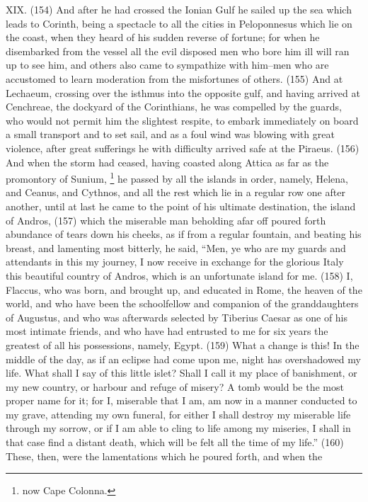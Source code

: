XIX. (154) And after he had crossed the Ionian Gulf he sailed up the sea which leads to Corinth,
being a spectacle to all the cities in Peloponnesus which lie on the coast, when they heard of his
sudden reverse of fortune; for when he disembarked from the vessel all the evil disposed men who
bore him ill will ran up to see him, and others also came to sympathize with him--men who are
accustomed to learn moderation from the misfortunes of others. (155) And at Lechaeum, crossing
over the isthmus into the opposite gulf, and having arrived at Cenchreae, the dockyard of the
Corinthians, he was compelled by the guards, who would not permit him the slightest respite, to
embark immediately on board a small transport and to set sail, and as a foul wind was blowing with
great violence, after great sufferings he with difficulty arrived safe at the Piraeus. (156) And when
the storm had ceased, having coasted along Attica as far as the promontory of Sunium, \footnote{now Cape
Colonna.} he passed by all the islands in order, namely, Helena, and Ceanus, and Cythnos, and all
the rest which lie in a regular row one after another, until at last he came to the point of his ultimate
destination, the island of Andros, (157) which the miserable man beholding afar off poured forth
abundance of tears down his cheeks, as if from a regular fountain, and beating his breast, and
lamenting most bitterly, he said, ``Men, ye who are my guards and attendants in this my journey, I
now receive in exchange for the glorious Italy this beautiful country of Andros, which is an
unfortunate island for me. (158) I, Flaccus, who was born, and brought up, and educated in Rome,
the heaven of the world, and who have been the schoolfellow and companion of the
granddaughters of Augustus, and who was afterwards selected by Tiberius Caesar as one of his
most intimate friends, and who have had entrusted to me for six years the greatest of all his
possessions, namely, Egypt. (159) What a change is this! In the middle of the day, as if an eclipse
had come upon me, night has overshadowed my life. What shall I say of this little islet? Shall I call it
my place of banishment, or my new country, or harbour and refuge of misery? A tomb would be the
most proper name for it; for I, miserable that I am, am now in a manner conducted to my grave,
attending my own funeral, for either I shall destroy my miserable life through my sorrow, or if I am
able to cling to life among my miseries, I shall in that case find a distant death, which will be felt all
the time of my life.'' (160) These, then, were the lamentations which he poured forth, and when the

